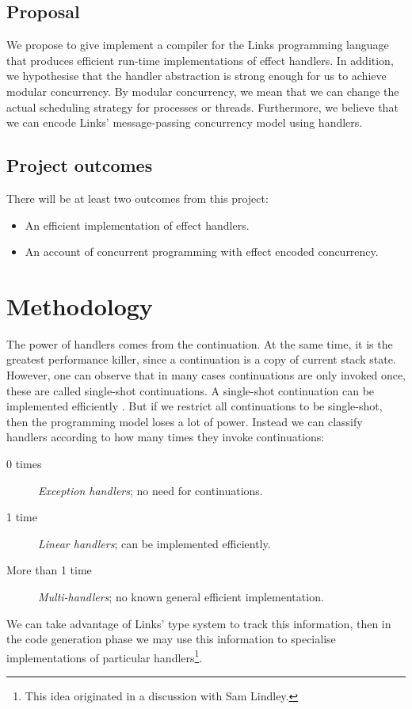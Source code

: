 \documentclass[preprint,10pt,numbers]{sigplanconf}
\begin{document}
\subsection{Proposal}
We propose to give implement a compiler for the Links programming language that produces efficient run-time implementations of effect handlers. In addition, we hypothesise that the handler abstraction is strong enough for us to achieve modular concurrency. By modular concurrency, we mean that we can change the actual scheduling strategy for processes or threads. Furthermore, we believe that we can encode Links' message-passing concurrency model using handlers. 

\subsection{Project outcomes}
There will be at least two outcomes from this project:
\begin{itemize}
  \item An efficient implementation of effect handlers.
  \item An account of concurrent programming with effect encoded concurrency.  
\end{itemize}

\section{Methodology}
The power of handlers comes from the continuation. At the same time, it is the greatest performance killer, since a continuation is a copy of current stack state.
However, one can observe that in many cases continuations are only invoked once, these are called single-shot continuations. A single-shot continuation can be implemented efficiently \cite{Bruggeman1996}. But if we restrict all continuations to be single-shot, then the programming model loses a lot of power. Instead we can classify handlers according to how many times they invoke continuations: 
\begin{description}
  \item[0 times] \emph{Exception handlers}; no need for continuations.
  \item[1 time] \emph{Linear handlers}; can be implemented efficiently.
  \item[More than 1 time] \emph{Multi-handlers}; no known general efficient implementation.
\end{description}
We can take advantage of Links' type system to track this information, then in the code generation phase we may use this information to specialise implementations of particular handlers\footnote{This idea originated in a discussion with Sam Lindley.}.
\end{document}
